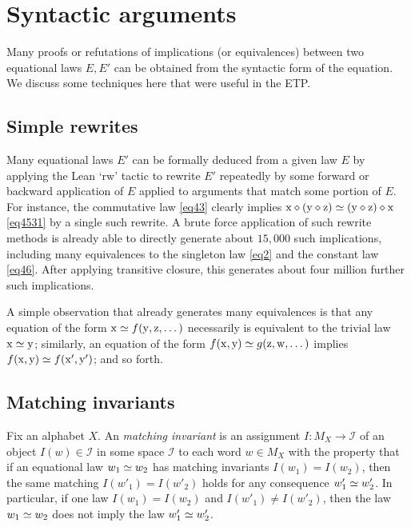 
\section{Syntactic arguments}\label{syntactic-sec}

Many proofs or refutations of implications (or equivalences) between two equational laws $E,E'$ can be obtained from the syntactic form of the equation.  We discuss some techniques here that were useful in the ETP.

\subsection{Simple rewrites}\label{rewrite-sec}

Many equational laws $E'$ can be formally deduced from a given law $E$ by applying the Lean `rw' tactic to rewrite $E'$ repeatedly by some forward or backward application of $E$ applied to arguments that match some portion of $E$.  For instance, the commutative law \eqref{eq43} clearly implies $\mathrm{x} \diamond (\mathrm{y} \diamond \mathrm{z}) \simeq (\mathrm{y} \diamond \mathrm{z}) \diamond \mathrm{x}$ \eqref{eq4531}
by a single such rewrite.  A brute force application of such rewrite methods is already able to directly generate about $15,000$ such implications, including many equivalences to the singleton law \eqref{eq2} and the constant law \eqref{eq46}.  After applying transitive closure, this generates about four million further such implications.

A simple observation that already generates many equivalences is that any equation of the form $\mathrm{x} \simeq f(\mathrm{y},\mathrm{z},\dots)$ necessarily is equivalent to the trivial law $\mathrm{x} \simeq \mathrm{y}$; similarly, an equation of the form $f(\mathrm{x},\mathrm{y}) \simeq g(\mathrm{z},\mathrm{w},\dots)$ implies $f(\mathrm{x},\mathrm{y}) \simeq f(\mathrm{x}',\mathrm{y}')$; and so forth. 

\subsection{Matching invariants}

Fix an alphabet $X$. An \emph{matching invariant} is an assignment $I \colon M_X \to {\mathcal I}$ of an object $I(w) \in {\mathcal I}$ in some space ${\mathcal I}$ to each word $w \in M_X$ with the property that if an equational law $w_1 \simeq w_2$ has matching invariants $I(w_1)=I(w_2)$, then the same matching $I(w'_1) = I(w'_2)$ holds for any consequence $w'_1 \simeq w'_2$.  In particular, if one law $I(w_1)=I(w_2)$ and $I(w'_1) \neq I(w'_2)$, then the law $w_1 \simeq w_2$ does not imply the law $w'_1 \simeq w'_2$.

